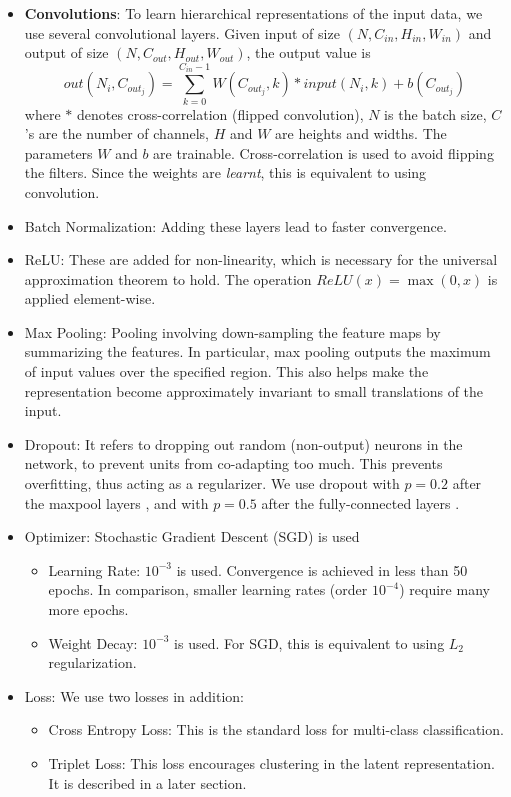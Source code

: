 \documentclass{article}
\newcommand{\B}[1]{\textbf{#1}}
\newcommand{\I}[1]{\textit{#1}}
\begin{document}
\begin{sloppypar}
        \begin{itemize}
            \item \B{Convolutions}: To learn hierarchical representations of the input data, we use several convolutional layers. Given input of size $(N, C_{in}, H_{in}, W_{in})$ and output of size $(N, C_{out}, H_{out}, W_{out})$, the output value is
                $$ out(N_i,C_{out_j}) = \sum_{k=0}^{C_{in}-1} W(C_{out_j},k) \ast input(N_i,k) + b(C_{out_j}) $$
            where $\ast$ denotes cross-correlation (flipped convolution), $N$ is the batch size, $C$'s are the number of channels, $H$ and $W$ are heights and widths. The parameters $W$ and $b$ are trainable. Cross-correlation is used to avoid flipping the filters. Since the weights are \I{learnt}, this is equivalent to using convolution.
            \item Batch Normalization: Adding these layers lead to faster convergence.
            \item ReLU: These are added for non-linearity, which is necessary for the universal approximation theorem to hold. The operation $ReLU(x)=\max(0,x)$ is applied element-wise.
            \item Max Pooling: Pooling involving down-sampling the feature maps by summarizing the features. In particular, max pooling outputs the maximum of input values over the specified region. This also helps make the representation become approximately invariant to small translations of the input.
            \item Dropout: It refers to dropping out random (non-output) neurons in the network, to prevent units from co-adapting too much. This prevents overfitting, thus acting as a regularizer. We use dropout with $p=0.2$ after the maxpool layers \cite{dropout_analysis}, and with $p=0.5$ after the fully-connected layers \cite{dropout_hinton}.
            \item Optimizer: Stochastic Gradient Descent (SGD) is used
                \begin{itemize}
                    \item Learning Rate: $10^{-3}$ is used. Convergence is achieved in less than 50 epochs. In comparison, smaller learning rates (order $10^{-4}$) require many more epochs.
                    \item Weight Decay: $10^{-3}$ is used. For SGD, this is equivalent to using $L_2$ regularization.
                \end{itemize}
            \item Loss: We use two losses in addition:
                \begin{itemize}
                    \item Cross Entropy Loss: This is the standard loss for multi-class classification.
                    \item Triplet Loss: This loss encourages clustering in the latent representation. It is described in a later section.
                \end{itemize}
        \end{itemize}


\end{sloppypar}
\end{document}
